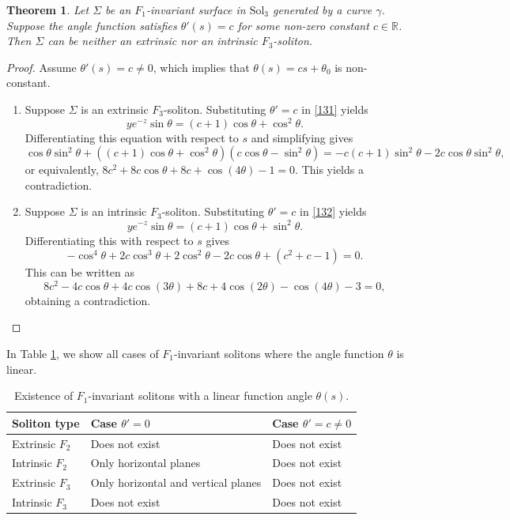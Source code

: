 \documentclass[a4paper,12pt]{amsart}
\theoremstyle{plain}
\newtheorem{theorem}{Theorem}[section]
\theoremstyle{definition}
\def\r{\mathbb R}
\def\sol{\text{Sol}_3}
\begin{document}
\begin{theorem}\label{t63}
 Let $\Sigma$ be an $F_1$-invariant surface in $\sol$ generated by a curve $\gamma$. Suppose the angle function satisfies $\theta'(s) = c$ for some non-zero constant $c \in \r$. Then $\Sigma$ can be neither an extrinsic nor an intrinsic $F_3$-soliton.
\end{theorem}

\begin{proof}
Assume $\theta'(s) = c \neq 0$, which implies that $\theta(s) = cs + \theta_0$ is non-constant. 
 
\begin{enumerate}
\item Suppose $\Sigma$ is an extrinsic $F_3$-soliton. 
Substituting $\theta' = c$ in \eqref{131} yields 
$$y e^{-z} \sin\theta = (c+1)\cos\theta + \cos^2\theta.$$
Differentiating this equation with respect to $s$ and simplifying gives
$$\cos\theta \sin^2\theta + \left( (c+1)\cos\theta + \cos^2\theta \right)(c\cos\theta - \sin^2\theta) = -c(c+1)\sin^2\theta - 2c\cos\theta\sin^2\theta,$$
or equivalently, $ 8 c^2+8 c \cos \theta +8 c+\cos (4 \theta )-1 = 0$. This yields a contradiction.

\item Suppose $\Sigma$ is an intrinsic $F_3$-soliton. 
Substituting $\theta' = c$ in \eqref{132} yields
$$y e^{-z} \sin\theta = (c+1)\cos\theta + \sin^2\theta.$$
Differentiating this with respect to $s$ gives 
$$-\cos^4\theta + 2c\cos^3\theta + 2\cos^2\theta - 2c\cos\theta + (c^2+c-1) = 0.$$
This can be written as 
$$ 8 c^2-4 c \cos \theta +4 c \cos (3 \theta )+8 c+4 \cos (2 \theta )-\cos (4 \theta )-3 =0,$$
obtaining a contradiction.
\end{enumerate}
\end{proof}


In Table \ref{table2}, we show all cases of $F_1$-invariant solitons where the angle function $\theta$ is linear. 

\begin{table}[h!]
\centering
\caption{Existence of $F_1$-invariant solitons with a linear function angle $\theta(s)$.}\label{table2}
\begin{tabular}{lll}
\hline
Soliton type & Case $\theta' = 0$ & Case $\theta' = c \neq 0$ \\
\hline
Extrinsic $F_2$ & Does not exist & Does not exist \\
Intrinsic $F_2$ & Only horizontal planes & Does not exist \\
Extrinsic $F_3$ & Only horizontal and vertical planes & Does not exist \\
Intrinsic $F_3$ & Does not exist & Does not exist \\
\hline
\end{tabular}
\end{table}
 
\end{document}
